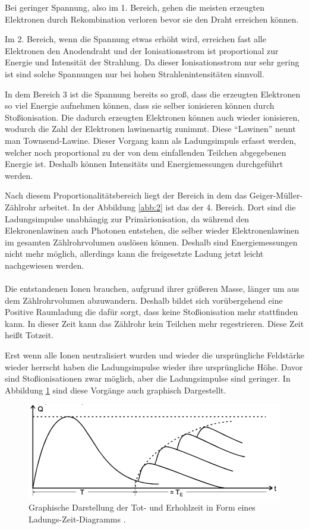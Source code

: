 Bei geringer Spannung, also im 1. Bereich, gehen die meisten erzeugten Elektronen
durch Rekombination verloren bevor sie den Draht erreichen können.

Im 2. Bereich, wenn die Spannung etwas erhöht wird, erreichen fast alle Elektronen
den Anodendraht und der Ionisationsstrom ist proportional zur Energie und Intensität
der Strahlung. Da dieser Ionisationsstrom nur sehr gering ist sind solche Spannungen
nur bei hohen Strahlenintensitäten sinnvoll.

In dem Bereich 3 ist die Spannung bereits so groß, dass die erzeugten Elektronen
so viel Energie aufnehmen können, dass sie selber ionisieren können durch Stoßionisation.
Die dadurch erzeugten Elektronen können auch wieder ionisieren, wodurch die Zahl der Elektronen
lawinenartig zunimmt. Diese \enquote{Lawinen} nennt man Townsend-Lawine. Dieser Vorgang
kann als Ladungsimpuls erfasst werden, welcher noch proportional zu der von dem
einfallenden Teilchen abgegebenen Energie ist. Deshalb können Intensitäts und Energiemessungen
durchgeführt werden.

Nach diesem Proportionalitätsbereich liegt der Bereich in dem das Geiger-Müller-
Zählrohr arbeitet. In der Abbildung \ref{abb:2} ist das der 4. Bereich. Dort sind
die Ladungsimpulse unabhängig zur Primärionisation, da während den Elekronenlawinen
auch Photonen entstehen, die selber wieder Elektronenlawinen im gesamten Zählrohrvolumen
auslösen können. Deshalb sind Energiemessungen nicht mehr möglich, allerdings
kann die freigesetzte Ladung jetzt leicht nachgewiesen werden.\\\\


Die entstandenen Ionen brauchen, aufgrund ihrer größeren Masse, länger um aus dem
Zählrohrvolumen abzuwandern. Deshalb bildet sich vorübergehend eine Positive Raumladung
die dafür sorgt, dass keine Stoßionisation mehr stattfinden kann. In dieser Zeit kann
das Zählrohr kein Teilchen mehr regestrieren. Diese Zeit heißt Totzeit.

Erst wenn alle Ionen neutralisiert wurden und wieder die ursprüngliche Feldstärke wieder
herrscht haben die Ladungsimpulse wieder ihre ursprüngliche Höhe. Davor sind Stoßionisationen
zwar möglich, aber die Ladungsimpulse sind geringer. In Abbildung \ref{abb:3} sind diese
Vorgänge auch graphisch Dargestellt.

\begin{figure}[H]
  \centering
  \includegraphics[width=\textwidth]{content/Totzeit.png}
  \caption{Graphische Darstellung der Tot- und Erhohlzeit in Form eines Ladungs-Zeit-Diagramms
  \cite{1}.}
  \label{abb:3}
\end{figure}

